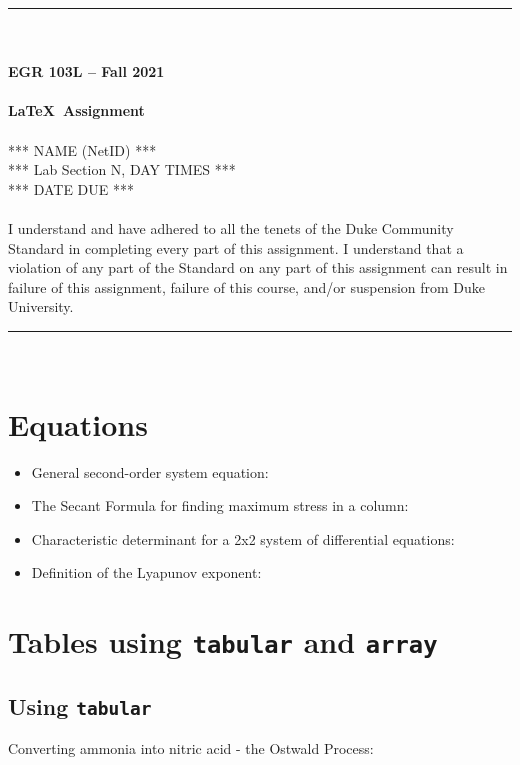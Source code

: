 \documentclass{article}
\begin{document}
\begin{center}
\rule{6.5in}{0.5mm}\\~\\
\textbf{\large EGR 103L -- Fall 2021}\\~\\
\textbf{\huge \LaTeX~Assignment}\\~\\
*** NAME (NetID) ***\\
*** Lab Section N, DAY TIMES ***\\
*** DATE DUE ***\\~\\
{\small I understand and have adhered to all the tenets of the Duke Community Standard in completing every part of this assignment.  I understand that a violation of any part of the Standard on any part of this assignment can result in failure of this assignment, failure of this course, and/or suspension from Duke University.} 
\rule{6.5in}{0.5mm}\\
\end{center}
\tableofcontents
\listoffigures
\pagebreak

\section{Equations} %
\begin{itemize}
\item General second-order system equation\cite[p.~221]{Rizzoni}:
\item The Secant Formula for finding maximum stress 
in a column\cite[p.~681]{Hibbeler}:
\item Characteristic determinant for a 2x2 system of 
differential equations\cite[p.~152]{Kreyszig}:
\item Definition of the Lyapunov exponent\cite[p.~56]{Ott}:
\end{itemize}

\section{Tables using \texttt{tabular} and \texttt{array}}
\subsection{Using \texttt{tabular}} %
Converting ammonia into nitric acid - the Ostwald Process\cite{Ostwald}:
\end{document}
